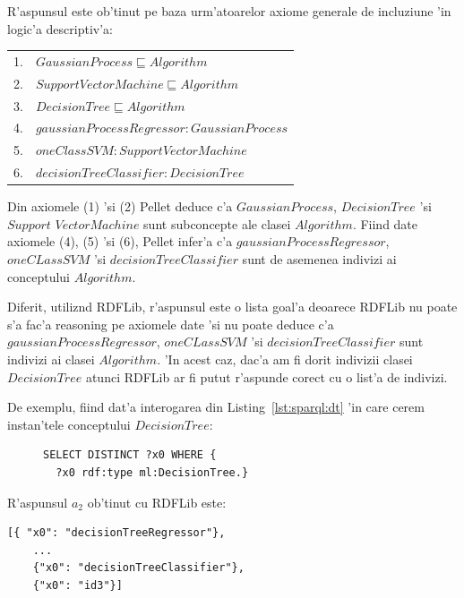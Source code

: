 \documentclass[12pt,a4paper,twoside]{report}
\begin{document}
R'aspunsul este ob'tinut pe baza urm'atoarelor axiome generale de incluziune 'in logic'a descriptiv'a:

\vspace*{0.3cm}
\begin{tabular}{ll}
1. & $GaussianProcess  \sqsubseteq Algorithm$\\
2. & $SupportVectorMachine  \sqsubseteq Algorithm$\\
3. & $DecisionTree  \sqsubseteq Algorithm$\\
4. & $gaussianProcessRegressor: GaussianProcess$\\
5. & $oneClassSVM: SupportVectorMachine$\\
6. & $decisionTreeClassifier: DecisionTree$\\
\end{tabular}
\vspace*{0.3cm}

Din axiomele (1) 'si (2) Pellet deduce c'a $GaussianProcess$, $DecisionTree$ 'si $Support$ $VectorMachine$ sunt subconcepte ale clasei $Algorithm$. Fiind date axiomele (4), (5) 'si (6), Pellet infer'a c'a $gaussianProcessRegressor$, $oneCLassSVM$ 'si $decisionTreeClassifier$ sunt de asemenea indivizi ai conceptului $Algorithm$. 

Diferit, utiliz\ia nd RDFLib, r'aspunsul este o lista goal'a deoarece RDFLib nu poate s'a fac'a reasoning pe axiomele date 'si nu poate deduce c'a $gaussianProcessRegressor$, $oneCLassSVM$ 'si $decisionTreeClassifier$ sunt indivizi ai clasei $Algorithm$. 
'In acest caz, dac'a am fi dorit indivizii clasei $DecisionTree$ atunci RDFLib ar fi putut r'aspunde corect cu o list'a de indivizi.

De exemplu, fiind dat'a interogarea din Listing~\ref{lst:sparql:dt} 'in care cerem instan'tele conceptului $DecisionTree$:


\begin{figure}[h]
\begin{footnotesize}
\begin{lstlisting}[captionpos=b, caption=Interogare SPARQL pentru ob'tinerea indivizilor clasei $DecisionTree$, label=lst:sparql:dt,
   basicstyle=\ttfamily,frame=single]
SELECT DISTINCT ?x0 WHERE {
  ?x0 rdf:type ml:DecisionTree.}
\end{lstlisting}
\end{footnotesize}
\end{figure}

R'aspunsul $a_2$ ob'tinut cu RDFLib este:

\begin{center}
\begin{lstlisting}[basicstyle=\footnotesize]
    [{ "x0": "decisionTreeRegressor"}, 
    ...
    {"x0": "decisionTreeClassifier"}, 
    {"x0": "id3"}]
\end{lstlisting}
\end{center}
\end{document}
